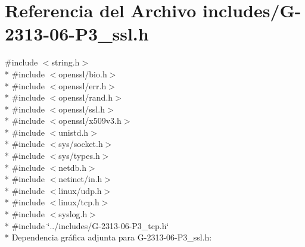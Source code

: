 \hypertarget{G-2313-06-P3__ssl_8h}{}\section{Referencia del Archivo includes/\+G-\/2313-\/06-\/\+P3\+\_\+ssl.h}
\label{G-2313-06-P3__ssl_8h}
{\ttfamily \#include $<$string.\+h$>$}\\*
{\ttfamily \#include $<$openssl/bio.\+h$>$}\\*
{\ttfamily \#include $<$openssl/err.\+h$>$}\\*
{\ttfamily \#include $<$openssl/rand.\+h$>$}\\*
{\ttfamily \#include $<$openssl/ssl.\+h$>$}\\*
{\ttfamily \#include $<$openssl/x509v3.\+h$>$}\\*
{\ttfamily \#include $<$unistd.\+h$>$}\\*
{\ttfamily \#include $<$sys/socket.\+h$>$}\\*
{\ttfamily \#include $<$sys/types.\+h$>$}\\*
{\ttfamily \#include $<$netdb.\+h$>$}\\*
{\ttfamily \#include $<$netinet/in.\+h$>$}\\*
{\ttfamily \#include $<$linux/udp.\+h$>$}\\*
{\ttfamily \#include $<$linux/tcp.\+h$>$}\\*
{\ttfamily \#include $<$syslog.\+h$>$}\\*
{\ttfamily \#include \char`\"{}../includes/\+G-\/2313-\/06-\/\+P3\+\_\+tcp.\+h\char`\"{}}\\*
Dependencia gráfica adjunta para G-\/2313-\/06-\/\+P3\+\_\+ssl.h\+:
